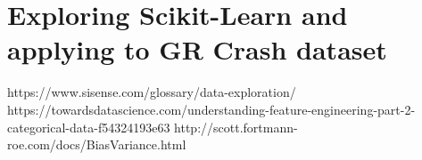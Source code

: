 \documentclass[notes]{beamer}
\begin{document}
\section{Exploring Scikit-Learn and applying to GR Crash dataset}
\frame{\tableofcontents[currentsection]}


\begin{frame}
	\begin{thebibliography}{9}
		 https://www.sisense.com/glossary/data-exploration/
		https://towardsdatascience.com/understanding-feature-engineering-part-2-categorical-data-f54324193e63
		http://scott.fortmann-roe.com/docs/BiasVariance.html
	\end{thebibliography}
\end{frame}
\end{document}
